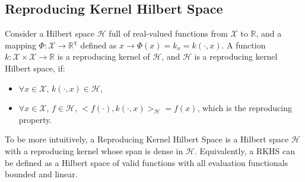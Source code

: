 \subsection{Reproducing Kernel Hilbert Space}
Consider a Hilbert space $\mathcal{H}$ full of real-valued functions from $\mathcal{X}$ to $\mathbb{R}$, and a mapping $\Phi: \mathcal{X}\rightarrow\mathbb{R}^\chi$ defined as $x\rightarrow\Phi(x)=k_x=k(\cdot , x)$. A function $k:\mathcal{X}\times\mathcal{X}\rightarrow\mathbb{R}$ is a 
reproducing kernel of $\mathcal{H}$, and $\mathcal{H}$ is a reproducing kernel Hilbert space, if:
\begin{itemize}
    \item $\forall x \in\mathcal{X}$, $k(\cdot, x)\in\mathcal{H}$,
    \item $\forall x \in\mathcal{X}$, $f\in\mathcal{H}$, $<f(\cdot),k(\cdot,x)>_\mathcal{H}=f(x)$, which is the reproducing property.
\end{itemize}
To be more intuitively, a Reproducing Kernel Hilbert Space is a Hilbert space $\mathcal{H}$ with a reproducing kernel whose span is dense in $\mathcal{H}$. Equivalently, a RKHS can be defined as a Hilbert space of valid functions  with all evaluation functionals bounded and linear. 


